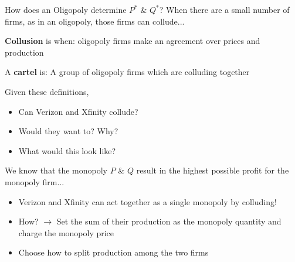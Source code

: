 \documentclass[compress]{beamer}
\begin{document}
\begin{frame}{How does an Oligopoly determine $P^*$ \& $Q^*$?}
    When there are a small number of firms, as in an oligopoly, those firms can collude...
    \begin{block}{\textbf{Collusion} is when:}
       oligopoly firms make an agreement over prices and production
    \end{block}
    \begin{block}{A \textbf{cartel} is:}
        A group of oligopoly firms which are colluding together
    \end{block}
\end{frame}

\begin{frame}{}
Given these definitions, 
    \begin{itemize}
    \item Can Verizon and Xfinity collude?
    \item Would they want to? Why?
    \item What would this look like?
\end{itemize} 

\vspace{4mm}

We know that the monopoly $P$ \& $Q$ result in the highest possible profit for the monopoly firm...
\begin{itemize}
    \item Verizon and Xfinity can act together as a single monopoly by colluding!
    \item How? $\to$ Set the sum of their production as the monopoly quantity and charge the monopoly price
    \item Choose how to split production among the two firms
\end{itemize}
\end{frame}
\end{document}
